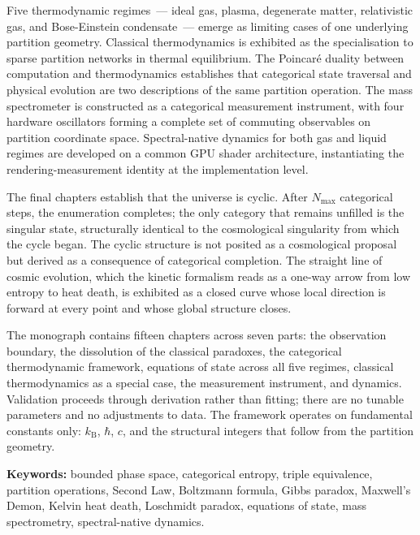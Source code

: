 \medskip

Five thermodynamic regimes~--- ideal gas, plasma, degenerate matter, relativistic gas,
and Bose-Einstein condensate~--- emerge as limiting cases of one underlying partition
geometry. Classical thermodynamics is exhibited as the specialisation to sparse
partition networks in thermal equilibrium. The Poincar\'e duality between computation
and thermodynamics establishes that categorical state traversal and physical evolution
are two descriptions of the same partition operation. The mass spectrometer is
constructed as a categorical measurement instrument, with four hardware oscillators
forming a complete set of commuting observables on partition coordinate space.
Spectral-native dynamics for both gas and liquid regimes are developed on a common
GPU shader architecture, instantiating the rendering-measurement identity at the
implementation level.

\medskip

The final chapters establish that the universe is cyclic. After $N_{\max}$ categorical
steps, the enumeration completes; the only category that remains unfilled is the
singular state, structurally identical to the cosmological singularity from which
the cycle began. The cyclic structure is not posited as a cosmological proposal
but derived as a consequence of categorical completion. The straight line of cosmic
evolution, which the kinetic formalism reads as a one-way arrow from low entropy to
heat death, is exhibited as a closed curve whose local direction is forward at every
point and whose global structure closes.

\medskip

The monograph contains fifteen chapters across seven parts: the observation boundary,
the dissolution of the classical paradoxes, the categorical thermodynamic framework,
equations of state across all five regimes, classical thermodynamics as a special
case, the measurement instrument, and dynamics. Validation proceeds through
derivation rather than fitting; there are no tunable parameters and no adjustments
to data. The framework operates on fundamental constants only: $k_{\mathrm{B}}$,
$\hbar$, $c$, and the structural integers that follow from the partition geometry.

\vspace{2em}

\noindent
\textbf{Keywords:} bounded phase space, categorical entropy, triple equivalence,
partition operations, Second Law, Boltzmann formula, Gibbs paradox, Maxwell's Demon,
Kelvin heat death, Loschmidt paradox, equations of state, mass spectrometry,
spectral-native dynamics.

\cleardoublepage
